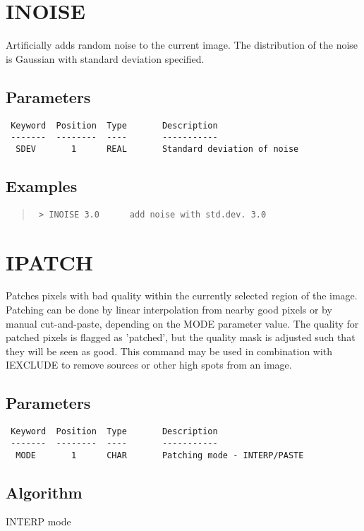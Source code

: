 \documentclass{book}
\renewcommand{\_}{{\tt\char'137}}     %
\begin{document}
\section{INOISE}
Artificially adds random noise to the current image. The distribution
of the noise is Gaussian with standard deviation specified.

\subsection{Parameters}
\begin{verbatim}
 Keyword  Position  Type       Description
 -------  --------  ----       -----------
  SDEV       1      REAL       Standard deviation of noise

\end{verbatim}\subsection{Examples}
\begin{quote}\begin{verbatim}
 > INOISE 3.0      add noise with std.dev. 3.0
 \end{verbatim}\end{quote}
\section{IPATCH}
Patches pixels with bad quality within the currently selected region
of the image. Patching can be done by linear interpolation from nearby
good pixels or by manual cut-and-paste, depending on the MODE parameter
value. The quality for patched pixels is flagged as 'patched',
but the quality mask is adjusted such that they will be seen as good.
This command may be used in combination with IEXCLUDE to remove sources
or other high spots from an image.

\subsection{Parameters}
\begin{verbatim}
 Keyword  Position  Type       Description
 -------  --------  ----       -----------
  MODE       1      CHAR       Patching mode - INTERP/PASTE

\end{verbatim}\subsection{Algorithm}
INTERP mode
\end{document}
